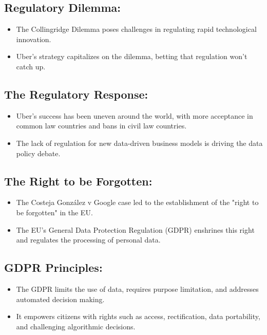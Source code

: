 \documentclass{article}
\begin{document}
\subsection*{Regulatory Dilemma:}
\begin{itemize}
    \item The Collingridge Dilemma poses challenges in regulating rapid technological innovation.
    \item Uber's strategy capitalizes on the dilemma, betting that regulation won't catch up.
\end{itemize}

\subsection*{The Regulatory Response:}
\begin{itemize}
    \item Uber's success has been uneven around the world, with more acceptance in common law countries and bans in civil law countries.
    \item The lack of regulation for new data-driven business models is driving the data policy debate.
\end{itemize}

\subsection*{The Right to be Forgotten:}
\begin{itemize}
    \item The Costeja González v Google case led to the establishment of the "right to be forgotten" in the EU.
    \item The EU's General Data Protection Regulation (GDPR) enshrines this right and regulates the processing of personal data.
\end{itemize}

\subsection*{GDPR Principles:}
\begin{itemize}
    \item The GDPR limits the use of data, requires purpose limitation, and addresses automated decision making.
    \item It empowers citizens with rights such as access, rectification, data portability, and challenging algorithmic decisions.
\end{itemize}
\end{document}
